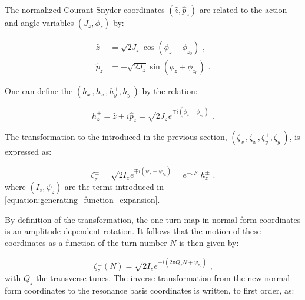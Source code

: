 The normalized Courant-Snyder coordinates \(\left( \hat{z}, \hat{p}_z \right)\) are related to the action and angle variables \(\left( J_z, \phi_z \right)\) by:

\begin{equation}
    \begin{aligned}
        \hat{z}   &= \sqrt{2 J_z} \cos \left( \phi_z + \phi_{z_0} \right) \text{ ,} \\
        \hat{p}_z &= - \sqrt{2 J_z} \sin \left( \phi_z + \phi_{z_0} \right) \text{ .}
    \end{aligned}
    \label{equation:normalized_courant_snyder_coordinates_from_action_angle}
\end{equation}

One can define the  \(\left( h_x^{+}, h_x^{-}, h_y^{+}, h_y^{-} \right)\) by the relation:

\begin{equation}
    h_z^{\pm} = \hat{z} \pm i \hat{p}_z = \sqrt{2 J_z} e^{\mp i \left( \phi_z + \phi_{z_0} \right)} \text{ .}
    \label{equation:resonance_basis_definition}
\end{equation}

The transformation to the  introduced in the previous section, \(\left( \zeta_x^{+}, \zeta_x^{-}, \zeta_y^{+}, \zeta_y^{-} \right)\), is expressed as:

\begin{equation}
    \zeta_z^{\pm} = \sqrt{2 I_z} e^{\mp i \left( \psi_z + \psi_{z_0} \right)} = e^{-:F:} h_z^{\pm} \text{ .}
    \label{equation:transformation_to_normal_form_coordinates_from_h_pm}
\end{equation}
where \((I_z, \psi_z)\) are the terms introduced in \cref{equation:generating_function_expansion}.

By definition of the transformation, the one-turn map in normal form coordinates is an amplitude dependent rotation.
It follows that the motion of these coordinates as a function of the turn number \(N\) is then given by:

\begin{equation}
    \zeta_z^{\pm}(N) = \sqrt{2 I_z} e^{\mp i \left( 2 \pi Q_z N + \psi_{z_0} \right)} \text{ ,}
    \label{equation:normal_form_N_turn_expression}
\end{equation}
with \(Q_z\) the transverse tunes.
The inverse transformation from the new normal form coordinates to the resonance basis coordinates is written, to first order, as:

